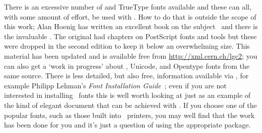     There is an excessive number of \pscript{}
and TrueType
fonts available 
and these can all, with some amount of effort, be used with \ltx. How to do
that is outside the scope of this work; Alan Hoenig has written an excellent
book on the subject~\cite{HOENIG98} and there is the invaluable 
 \cite[Chapter 7 Fonts and Encodings]{COMPANION}. 
The original  had chapters on PostScript
fonts and tools but these were dropped in the second edition to keep it below
an overwhelming size. This material has been updated and is available
free from \url{http://xml.cern.ch/lgc2}; you can also get a 
`work in progress'
about \pixxetx, Unicode, and 
Opentype
fonts from the same source. 
There is less detailed, but also free, 
information available via \pixctan, for example Philipp Lehman's 
\textit{Font Installation Guide}~\cite{FONTINST}; even if you are not 
interested in
installing \pscript\ fonts this is well worth looking at just as an
example of the kind of elegant document that can be achieved with \ltx.
If you choose one of the popular
\pscript{} fonts, such as those built 
into \ixpscript\ printers, you may 
well find that the work has been done for you and it's just a question
of using the appropriate 
package.%

